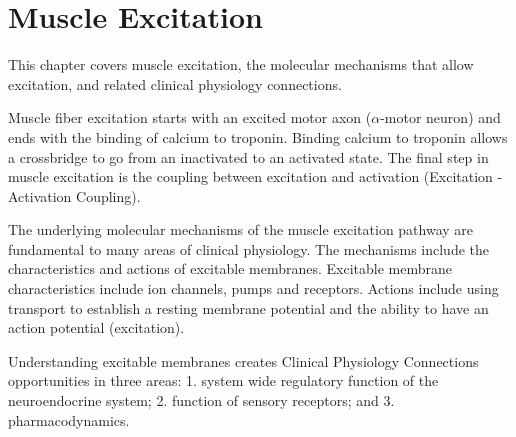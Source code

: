 \chapter{Muscle Excitation}\label{chp:excitation}






\minitoc

This chapter covers muscle excitation, the molecular mechanisms that allow excitation, and related clinical physiology connections. 

Muscle fiber excitation starts with an excited motor axon ($\alpha$-motor neuron) and ends with the binding of calcium to troponin. Binding calcium to troponin allows a crossbridge to go from an inactivated to an activated state. The final step in muscle excitation is the coupling between excitation and activation (Excitation - Activation Coupling). 

The underlying molecular mechanisms of the muscle excitation pathway are fundamental to many areas of clinical physiology. The mechanisms include the characteristics and actions of excitable membranes. Excitable membrane characteristics include ion channels, pumps and receptors. Actions include using transport to establish a resting membrane potential and the ability to have an action potential (excitation). 

Understanding excitable membranes creates Clinical Physiology Connections opportunities in three areas: 1. system wide regulatory function of the neuroendocrine system; 2. function of sensory receptors; and 3. pharmacodynamics.

\vspace{5mm}

